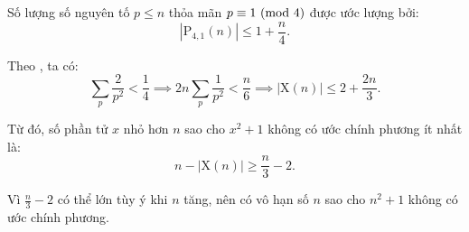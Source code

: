 \documentclass[../08-quadratic-residues.tex]{subfiles}
\begin{document}
\begin{soln}
	Số lượng số nguyên tố \( p \leq n \) thỏa mãn \( p \equiv 1 \ (\mathrm{mod}\ 4) \) được ước lượng bởi:
	\[
		|\text{P}_{4,1}(n)| \leq 1 + \frac{n}{4}.
	\]

	Theo , ta có:
	\[
		\sum_{p} \frac{2}{p^2} < \frac{1}{4} \implies 2n \sum_{p} \frac{1}{p^2} < \frac{n}{6} \implies |\text{X}(n)| \leq 2 + \frac{2n}{3}.
	\]
	
	Từ đó, số phần tử \( x \) nhỏ hơn \( n \) sao cho \( x^2 + 1 \) không có ước chính phương ít nhất là:
	\[
		n - |\text{X}(n)| \geq \frac{n}{3} - 2.
	\]

	Vì \( \frac{n}{3} - 2 \) có thể lớn tùy ý khi \( n \) tăng, nên có vô hạn số \( n \) sao cho \( n^2 + 1 \) không có ước chính phương.
\end{soln}

\end{document}
